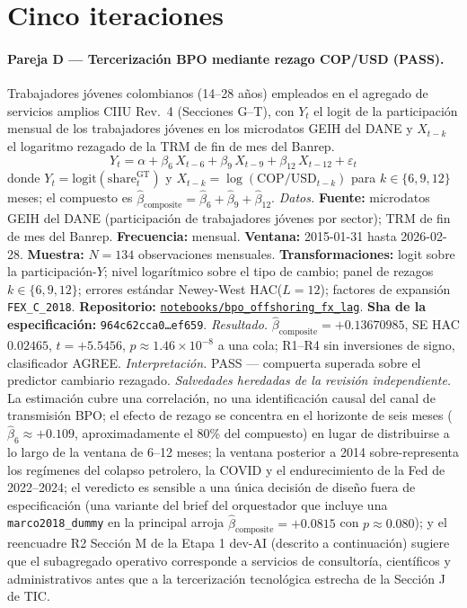 \documentclass[11pt,a4paper]{article}
\theoremstyle{plain}
\begin{document}
\section{Cinco iteraciones}\label{sec:2}

\paragraph{Pareja D --- Tercerización BPO mediante rezago COP/USD (PASS).}
Trabajadores jóvenes colombianos (14--28 años) empleados en el agregado de servicios amplios CIIU Rev.~4 (Secciones G--T), con \(Y_t\) el logit de la participación mensual de los trabajadores jóvenes en los microdatos GEIH del DANE y \(X_{t-k}\) el logaritmo rezagado de la TRM de fin de mes del Banrep.
\[ Y_t = \alpha + \beta_6\, X_{t-6} + \beta_9\, X_{t-9} + \beta_{12}\, X_{t-12} + \varepsilon_t \]
donde \(Y_t = \mathrm{logit}(\mathrm{share}_t^{\mathrm{GT}})\) y \(X_{t-k} = \log(\mathrm{COP}/\mathrm{USD}_{t-k})\) para \(k \in \{6, 9, 12\}\) meses; el compuesto es \(\hat{\beta}_{\mathrm{composite}} = \hat{\beta}_6 + \hat{\beta}_9 + \hat{\beta}_{12}\).
\textit{Datos.} \textbf{Fuente:} microdatos GEIH del DANE (participación de trabajadores jóvenes por sector); TRM de fin de mes del Banrep. \textbf{Frecuencia:} mensual. \textbf{Ventana:} 2015-01-31 hasta 2026-02-28. \textbf{Muestra:} \(N = 134\) observaciones mensuales. \textbf{Transformaciones:} logit sobre la participación-\(Y\); nivel logarítmico sobre el tipo de cambio; panel de rezagos \(k \in \{6, 9, 12\}\); errores estándar Newey-West HAC(\(L=12\)); factores de expansión \texttt{FEX\_C\_2018}. \textbf{Repositorio:} \href{https://github.com/JMSBPP/abrigo-analytics/tree/master/notebooks/bpo_offshoring_fx_lag}{\texttt{notebooks/bpo\_offshoring\_fx\_lag}}. \textbf{Sha de la especificación:} \texttt{964c62cca0\ldots ef659}.
\textit{Resultado.} \(\hat{\beta}_{\mathrm{composite}} = +0.13670985\), SE HAC \(0.02465\), \(t = +5.5456\), \(p \approx 1.46 \times 10^{-8}\) a una cola; R1--R4 sin inversiones de signo, clasificador AGREE.
\textit{Interpretación.} PASS --- compuerta superada sobre el predictor cambiario rezagado.
\textit{Salvedades heredadas de la revisión independiente.} La estimación cubre una correlación, no una identificación causal del canal de transmisión BPO; el efecto de rezago se concentra en el horizonte de seis meses (\(\hat{\beta}_6 \approx +0.109\), aproximadamente el 80\% del compuesto) en lugar de distribuirse a lo largo de la ventana de 6--12 meses; la ventana posterior a 2014 sobre-representa los regímenes del colapso petrolero, la COVID y el endurecimiento de la Fed de 2022--2024; el veredicto es sensible a una única decisión de diseño fuera de especificación (una variante del brief del orquestador que incluye una \texttt{marco2018\_dummy} en la principal arroja \(\hat{\beta}_{\mathrm{composite}} = +0.0815\) con \(p \approx 0.080\)); y el reencuadre R2 Sección M de la Etapa 1 dev-AI (descrito a continuación) sugiere que el subagregado operativo corresponde a servicios de consultoría, científicos y administrativos antes que a la tercerización tecnológica estrecha de la Sección J de TIC.
\end{document}
